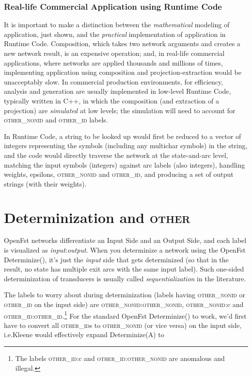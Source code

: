 \documentclass[letterpaper,11pt]{article}
\providecommand{\acro}{}\renewcommand{\acro}{\textsc}
\begin{document}
\subsubsection{Real-life Commercial Application using Runtime Code}

It is important to make a distinction between the
\emph{mathematical} modeling of application, just shown, and the
\emph{practical} implementation of application in Runtime Code.
Composition, which takes two network arguments and creates a new
network result, is an expensive operation; and, in real-life commercial applications, where
networks are applied thousands and millions of times, implementing
application using composition and projection-extraction would be unacceptably slow.
In commercial production environments, for efficiency,
analysis and generation are usually implemented in low-level Runtime Code, typically written in
C++, in which the
composition (and extraction of a projection) are \emph{simulated}
at low levels; the simulation will need to account for \acro{other\_nonid}
and \acro{other\_id} labels.  

In Runtime Code, a string to be looked up would first be reduced to a vector of integers
representing the symbols (including any multichar symbols) in the string, and the code would directly
traverse the network at the state-and-arc level, matching the input symbols (integers) against
arc labels (also integers), handling weights, epsilons, \acro{other\_nonid} and
\acro{other\_id}, and producing a set of output strings (with their weights).

\section{Determinization and \acro{other}}

OpenFst networks differentiate an Input Side and an Output Side, and
each label is visualized as \emph{input}:\emph{output}.  When you
determinize a network using the OpenFst Determinize(), it's just the
\emph{input} side that gets determinized (so that in the result, no state has
multiple exit arcs with the same input label).  Such one-sided determinization of transducers is usually
called \emph{sequentialization} in the literature.

The labels to worry about during determinization (labels having \acro{other\_nonid} or \acro{other\_id} on the input side) are \acro{other\_nonid}:\acro{other\_nonid},
\acro{other\_nonid}:c and \acro{other\_id}:\acro{other\_id}.\footnote{The labels \acro{other\_id}:c and
\acro{other\_id}:\acro{other\_nonid} are anomalous and illegal.}  For the
standard OpenFst Determinize() to work, we'd first have to convert all
\acro{other\_id}s to \acro{other\_nonid} (or vice versa) on the input side, i.e.\@ Kleene would
effectively expand Determinize(A) to
\end{document}
